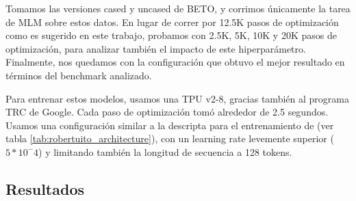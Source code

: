 Tomamos las versiones cased y uncased de BETO, y corrimos únicamente la tarea de MLM sobre estos datos. En lugar de correr por 12.5K pasos de optimización como es sugerido en este trabajo, probamos con 2.5K, 5K, 10K y 20K pasos de optimización, para analizar también el impacto de este hiperparámetro. Finalmente, nos quedamos con la configuración que obtuvo el mejor resultado en términos del benchmark analizado.

Para entrenar estos modelos, usamos una TPU v2-8, gracias también al programa TRC de Google. Cada paso de optimización tomó alrededor de 2.5 segundos. Usamos una configuración similar a la descripta para el entrenamiento de \robertuito{} (ver tabla \ref{tab:robertuito_architecture}), con un learning rate levemente superior ($5 * 10^-4$) y limitando también la longitud de secuencia a 128 tokens.

\subsection{Resultados}
\label{sec:domain_adaptation_results}


